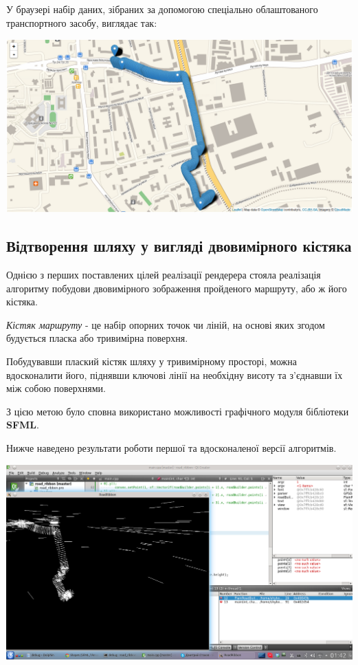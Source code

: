 \documentclass[simple,a4paper,14pt,ukrainian,utf8]{eskdtext}
\begin{document}
    У браузері набір даних, зібраних за допомогою спеціально облаштованого транспортного засобу, виглядає так:
    
    \vspace{3em}
    
    \includegraphics[scale=0.34]{images/leaflet_renderer.png}
    
    \newpage
    	
    \subsection{Відтворення шляху у вигляді двовимірного кістяка}
    
    Однією з перших поставлених цілей реалізації рендерера стояла реалізація алгоритму побудови двовимірного зображення пройденого маршруту, або ж його кістяка. 
    
    \textit{Кістяк маршруту} - це набір опорних точок чи ліній, на основі яких згодом будується пласка або тривимірна поверхня.
    
    Побудувавши плаский кістяк шляху у тривимірному просторі, можна вдосконалити його, піднявши ключові лінії на необхідну висоту та з’єднавши їх між собою поверхнями.
    
    З цією метою було сповна використано можливості графічного модуля бібліотеки \textbf{SFML}.
    
    Нижче наведено результати роботи першої та вдосконаленої версії алгоритмів.
    
    \vspace{3em}
    
    \includegraphics[scale=0.34]{images/road2d_1.png}
    
\end{document}
